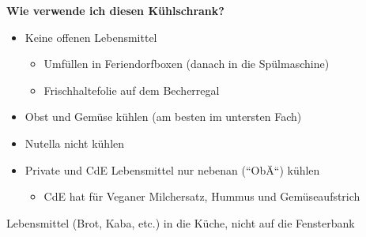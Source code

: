 \documentclass[24pt]{scrartcl}
\begin{document}
\vfill

\vfill
\begin{center}
\fontsize{40}{48}
\textbf{Wie verwende ich diesen Kühlschrank?}
\end{center}
\vfill
\begin{itemize}
 \item Keine offenen Lebensmittel
\begin{itemize}
 \item Umfüllen in Feriendorfboxen (danach in die Spülmaschine)
 \item Frischhaltefolie auf dem Becherregal
\end{itemize}
\item Obst und Gemüse kühlen (am besten im untersten Fach)
\item Nutella nicht kühlen
\item Private und CdE Lebensmittel nur nebenan (``ObÄ``) kühlen
\begin{itemize}
 \item CdE hat für Veganer Milchersatz, Hummus und Gemüseaufstrich
\end{itemize}
\end{itemize}
\begin{center}
\end{center}
\vfill
\begin{center}

\end{center}
\vfill
\begin{center}
  Lebensmittel (Brot, Kaba, etc.) in die Küche, nicht auf die Fensterbank
\end{center}
\vfill
\end{document}
